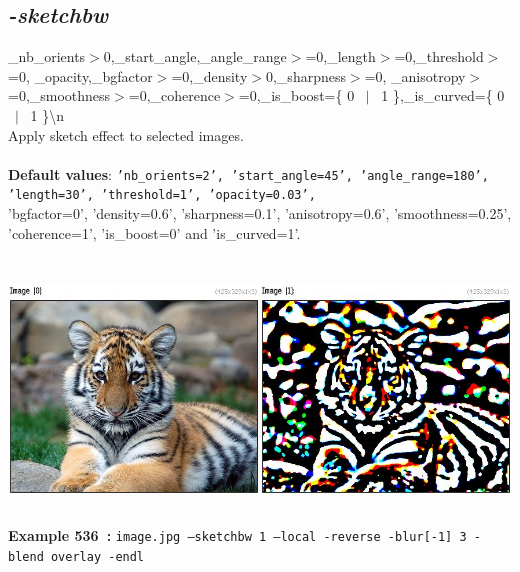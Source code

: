 \documentclass[a4paper,11pt,twoside]{book}
\begin{document}
\subsection{\emph{-sketchbw} }\vspace*{-0.5em}
\_nb\_orients$>$0,\_start\_angle,\_angle\_range$>$=0,\_length$>$=0,\_threshold$>$=0,
\_opacity,\_bgfactor$>$=0,\_density$>$0,\_sharpness$>$=0,
\_anisotropy$>$=0,\_smoothness$>$=0,\_coherence$>$=0,\_is\_boost=\{ 0 ~$|$~ 1 \},\_is\_curved=\{ 0 ~$|$~ 1 \}\textbackslash n
~\\Apply sketch effect to selected images.
~\\~\\\textbf{Default values}: {\small \texttt{'nb\_orients=2', 'start\_angle=45', 'angle\_range=180', 'length=30', 'threshold=1', 'opacity=0.03',}}
~\\'bgfactor=0', 'density=0.6', 'sharpness=0.1', 'anisotropy=0.6', 'smoothness=0.25', 'coherence=1', 'is\_boost=0' and 'is\_curved=1'.
\begin{center}\includegraphics[keepaspectratio=true,height=7cm,width=\textwidth]{img/gmic_def536.jpg}\\
{\footnotesize \textbf{Example 536~:} \texttt{image.jpg --sketchbw 1 --local -reverse -blur[-1] 3 -blend overlay -endl}}
\end{center}
\end{document}
